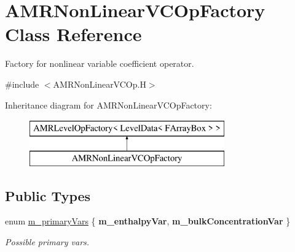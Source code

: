 \hypertarget{class_a_m_r_non_linear_v_c_op_factory}{\section{A\-M\-R\-Non\-Linear\-V\-C\-Op\-Factory Class Reference}
\label{class_a_m_r_non_linear_v_c_op_factory}
}


Factory for nonlinear variable coefficient operator.  




{\ttfamily \#include $<$A\-M\-R\-Non\-Linear\-V\-C\-Op.\-H$>$}

Inheritance diagram for A\-M\-R\-Non\-Linear\-V\-C\-Op\-Factory\-:\begin{figure}[H]
\begin{center}
\leavevmode
\includegraphics[height=2.000000cm]{class_a_m_r_non_linear_v_c_op_factory}
\end{center}
\end{figure}
\subsection*{Public Types}
\begin{DoxyCompactItemize}
\item 
enum \hyperlink{class_a_m_r_non_linear_v_c_op_factory_acc779bb08c5f5596fe83baf55da7a05a}{m\-\_\-primary\-Vars} \{ {\bfseries m\-\_\-enthalpy\-Var}, 
{\bfseries m\-\_\-bulk\-Concentration\-Var}
 \}
\begin{DoxyCompactList}\small\item\em Possible primary vars. \end{DoxyCompactList}\end{DoxyCompactItemize}
